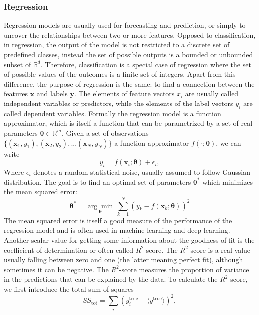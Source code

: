 \documentclass[12pt, a4paper,  nobibnotes]{article}
\begin{document}
\subsubsection{Regression}
Regression models are usually used 
for forecasting and prediction, or simply to uncover the relationships between two or more features.
Opposed to classification, in regression, the output of the model is not restricted to 
a discrete set of predefined classes, instead the set of possible outputs is a 
bounded or unbounded subset of $\mathbb R^d$. Therefore, classification is a
special case of regression where the set of possible values of the outcomes is 
a finite set of integers.
Apart from this difference, the purpose of regression is the same: to find a connection 
between the features $\mathbf x$ and labels $\mathbf y$. 
The elements of feature vectors $x_i$ are usually called independent variables or predictors, 
while the elements of the label vectors $y_i$ are called dependent variables.
Formally the regression model is a function approximator, which is itself a function that can be 
parametrized by a set of real parameters $\pmb \theta\in \mathbb R^m$. Given a set of observations 
$\{(\mathbf x_1, y_1), (\mathbf x_2, y_2), ... (\mathbf x_N, y_N)\}$ a function approximator $f(\cdot;\pmb\theta)$,
we can write
\begin{equation}
    y_i = f(\mathbf x_i; \pmb\theta) + \epsilon_i,
\end{equation}
Where $\epsilon_i$ denotes a random statistical noise, usually assumed to follow Gaussian distribution.
The goal is to find an optimal set of parameters $\pmb\theta^*$ which minimizes the mean squared 
error:
\begin{equation}
    \pmb\theta^* = \underset{\pmb\theta}{\arg\min}\,\sum\limits_{k=1}^N(y_k - f(\mathbf x_k;\pmb\theta))^2
\end{equation}
The mean squared error is itself a good measure of the performance of the regression model and
is often used in machine learning and deep learning. Another scalar value for 
getting some information about the 
goodness of fit is the coefficient of determination or often called $R^2$-score.
The $R^2$-score is a real value usually falling between zero and one (the latter meaning 
perfect fit), although sometimes it can be negative.
The $R^2$-score measures the proportion of variance in the predictions that can be 
explained by the data.
To calculate the $R^2$-score, we first introduce the total sum of squares
\begin{equation}
    SS_{\textrm{tot}} = \sum\limits_{i}(y^{\textrm{true}}_i-\langle y^{\textrm{true}} \rangle)^2,
\end{equation}
\end{document}
